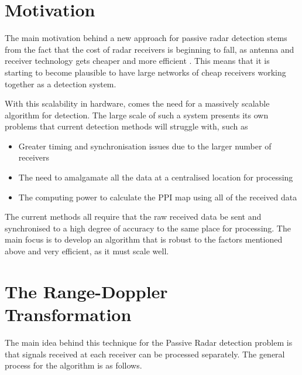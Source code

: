 \documentclass[12pt,openany,a4paper]{book}
\begin{document}
\section{Motivation}
The main motivation behind a new approach for passive radar detection stems from the fact that the cost of radar receivers is beginning to fall, as antenna and receiver technology gets cheaper and more efficient \cite{CMOS,lowCost}. This means that it is starting to become plausible to have large networks of cheap receivers working together as a detection system.

\bigskip

With this scalability in hardware, comes the need for a massively scalable algorithm for detection. The large scale of such a system presents its own problems that current detection methods will struggle with, such as

\begin{itemize}
	\item{Greater timing and synchronisation issues due to the larger number of receivers}
	\item{The need to amalgamate all the data at a centralised location for processing}
	\item{The computing power to calculate the PPI map using all of the received data}
\end{itemize}

The current methods all require that the raw received data be sent and synchronised to a high degree of accuracy to the same place for processing. The main focus is to develop an algorithm that is robust to the factors mentioned above and very efficient, as it must scale well.


\section{The Range-Doppler Transformation}
The main idea behind this technique for the Passive Radar detection problem is that signals received at each receiver can be processed separately. The general process for the algorithm is as follows.
\end{document}
